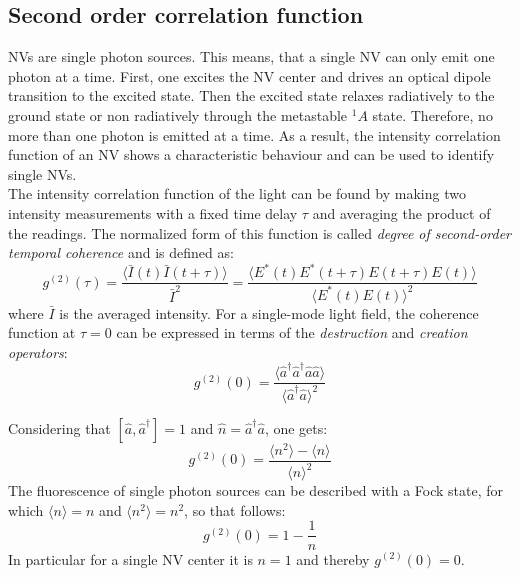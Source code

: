 \documentclass[12pt,a4paper]{article}
\begin{document}
\subsection{Second order correlation function}\label{g2}
NVs are single photon sources. This means, that a single NV can only emit one photon at a time. First, one excites the NV center and drives an optical dipole transition to the excited state. Then the excited state relaxes radiatively to the ground state or non radiatively through the metastable $^1A$ state. Therefore, no more than one photon is emitted at a time. As a result, the intensity correlation function of an NV shows a characteristic behaviour and can be used to identify single NVs. \\
The intensity correlation function of the light can be found by making two intensity measurements with a fixed time delay $\tau$ and averaging the product of the readings. The normalized form of this function is called \textit{degree of second-order temporal coherence} and is defined as:
\begin{equation}
g^{(2)}(\tau)=\frac{\langle\bar{I}(t)\bar{I}(t+\tau)\rangle}{\bar{I}^2}=\frac{\langle E^*(t)E^*(t+\tau)E(t+\tau)E(t)\rangle}{\langle E^*(t)E(t)\rangle^2}
\end{equation}
where $\bar{I}$ is the averaged intensity\cite{qtl}. For a single-mode light field, the coherence function at $\tau =0$ can be expressed in terms of the \textit{destruction} and \textit{creation operators}:
\begin{equation}
g^{(2)}(0)=\frac{\langle \hat{a}^\dag\hat{a}^\dag\hat{a}\hat{a}\rangle}{\langle\hat{a}^\dag\hat{a}\rangle ^2}
\end{equation}

Considering that $[\hat{a},\hat{a}^\dag]=1$ and $\hat{n}=\hat{a}^\dag\hat{a}$, one gets:
\begin{equation}
g^{(2)}(0)=\frac{\langle n^2\rangle -\langle n\rangle}{\langle n\rangle ^2}
\end{equation}
The fluorescence of single photon sources can be described with a Fock state, for which $\langle n\rangle =n$ and $\langle n^2\rangle =n^2$, so that follows:
\begin{equation}
g^{(2)}(0)=1-\frac{1}{n}
\end{equation}
In particular for a single NV center it is $n=1$ and thereby $g^{(2)}(0)=0$.
\end{document}
